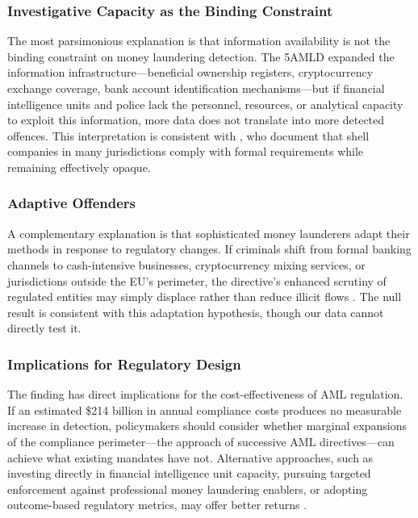 \documentclass[12pt]{article}
\begin{document}
\subsubsection*{Investigative Capacity as the Binding Constraint}
The most parsimonious explanation is that information availability is not the binding constraint on money laundering detection. The 5AMLD expanded the information infrastructure---beneficial ownership registers, cryptocurrency exchange coverage, bank account identification mechanisms---but if financial intelligence units and police lack the personnel, resources, or analytical capacity to exploit this information, more data does not translate into more detected offences. This interpretation is consistent with \citet{findley2014}, who document that shell companies in many jurisdictions comply with formal requirements while remaining effectively opaque.

\subsubsection*{Adaptive Offenders}
A complementary explanation is that sophisticated money launderers adapt their methods in response to regulatory changes. If criminals shift from formal banking channels to cash-intensive businesses, cryptocurrency mixing services, or jurisdictions outside the EU's perimeter, the directive's enhanced scrutiny of regulated entities may simply displace rather than reduce illicit flows \citep{sharman2011}. The null result is consistent with this adaptation hypothesis, though our data cannot directly test it.

\subsubsection*{Implications for Regulatory Design}
The finding has direct implications for the cost-effectiveness of AML regulation. If an estimated \$214 billion in annual compliance costs produces no measurable increase in detection, policymakers should consider whether marginal expansions of the compliance perimeter---the approach of successive AML directives---can achieve what existing mandates have not. Alternative approaches, such as investing directly in financial intelligence unit capacity, pursuing targeted enforcement against professional money laundering enablers, or adopting outcome-based regulatory metrics, may offer better returns \citep{pol2020}.
\end{document}
